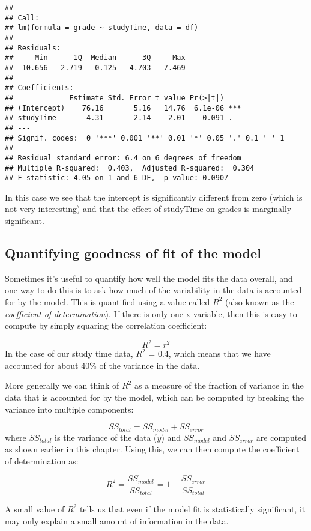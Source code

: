 \documentclass[]{book}
\theoremstyle{definition}
\theoremstyle{definition}
\theoremstyle{definition}
\theoremstyle{remark}
\begin{document}
\begin{verbatim}
## 
## Call:
## lm(formula = grade ~ studyTime, data = df)
## 
## Residuals:
##     Min      1Q  Median      3Q     Max 
## -10.656  -2.719   0.125   4.703   7.469 
## 
## Coefficients:
##             Estimate Std. Error t value Pr(>|t|)    
## (Intercept)    76.16       5.16   14.76  6.1e-06 ***
## studyTime       4.31       2.14    2.01    0.091 .  
## ---
## Signif. codes:  0 '***' 0.001 '**' 0.01 '*' 0.05 '.' 0.1 ' ' 1
## 
## Residual standard error: 6.4 on 6 degrees of freedom
## Multiple R-squared:  0.403,  Adjusted R-squared:  0.304 
## F-statistic: 4.05 on 1 and 6 DF,  p-value: 0.0907
\end{verbatim}

In this case we see that the intercept is significantly different from
zero (which is not very interesting) and that the effect of studyTime on
grades is marginally significant.

\subsection{Quantifying goodness of fit of the
model}\label{quantifying-goodness-of-fit-of-the-model}

Sometimes it's useful to quantify how well the model fits the data
overall, and one way to do this is to ask how much of the variability in
the data is accounted for by the model. This is quantified using a value
called \(R^2\) (also known as the \emph{coefficient of determination}).
If there is only one x variable, then this is easy to compute by simply
squaring the correlation coefficient:

\[
R^2 = r^2
\] In the case of our study time data, \(R^2\) = 0.4, which means that
we have accounted for about 40\% of the variance in the data.

More generally we can think of \(R^2\) as a measure of the fraction of
variance in the data that is accounted for by the model, which can be
computed by breaking the variance into multiple components:

\[
SS_{total} = SS_{model} + SS_{error}
\] where \(SS_{total}\) is the variance of the data (\(y\)) and
\(SS_{model}\) and \(SS_{error}\) are computed as shown earlier in this
chapter. Using this, we can then compute the coefficient of
determination as:

\[
R^2 = \frac{SS_{model}}{SS_{total}} = 1 - \frac{SS_{error}}{SS_{total}}
\]

A small value of \(R^2\) tells us that even if the model fit is
statistically significant, it may only explain a small amount of
information in the data.
\end{document}
